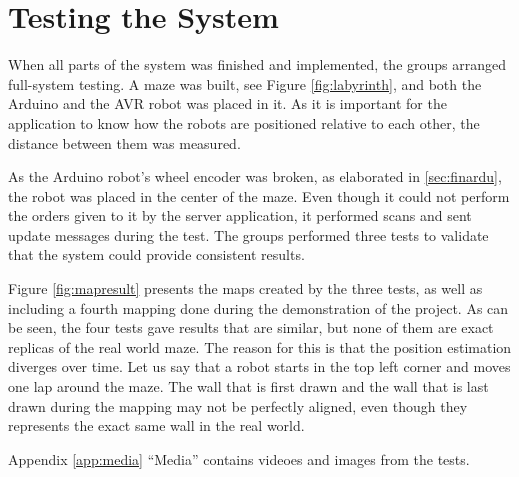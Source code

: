 \chapter{Testing the System}
When all parts of the system was finished and implemented, the groups arranged full-system testing. A maze was built, see Figure \ref{fig:labyrinth}, and both the Arduino and the AVR robot was placed in it. As it is important for the application to know how the robots are positioned relative to each other, the distance between them was measured.


As the Arduino robot's wheel encoder was broken, as elaborated in \ref{sec:finardu}, the robot was placed in the center of the maze. Even though it could not perform the orders given to it by the server application, it performed scans and sent update messages during the test. The groups performed three tests to validate that the system could provide consistent results.

Figure \ref{fig:mapresult} presents the maps created by the three tests, as well as including a fourth mapping done during the demonstration of the project. As can be seen, the four tests gave results that are similar, but none of them are exact replicas of the real world maze. The reason for this is that the position estimation diverges over time. Let us say that a robot starts in the top left corner and moves one lap around the maze. The wall that is first drawn and the wall that is last drawn during the mapping may not be perfectly aligned, even though they represents the exact same wall in the real world.

Appendix \ref{app:media} ``Media'' contains videoes and images from the tests.

